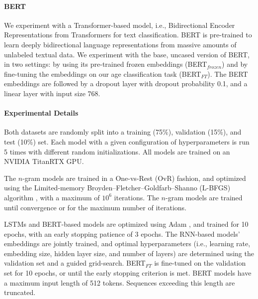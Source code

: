 \paragraph{BERT} 
We experiment with a Transformer-based model, i.e., 
Bidirectional Encoder Representations from Transformers \cite[BERT;][]{devlin-etal-2019-bert} for text classification.
BERT is pre-trained to learn deeply bidirectional language representations from massive amounts of unlabeled textual data. 
We experiment with the base, uncased version of BERT, in two settings: by using its 
pre-trained frozen embeddings (BERT$_{frozen}$) and by fine-tuning the embeddings on our age classification task (BERT$_{FT}$).
The BERT embeddings are followed by a dropout layer with dropout probability 0.1, and a linear layer with input size 768.

\paragraph{Experimental Details} %

Both datasets are randomly split into a training (75\%), validation (15\%), and test (10\%) set.
Each model with a given configuration of hyperparameters is run 5 times with different random initializations. All models are trained on an NVIDIA TitanRTX GPU.

The $n$-gram models are trained in a One-vs-Rest (OvR) fashion, and optimized using the Limited-memory Broyden–Fletcher–Goldfarb–Shanno (L-BFGS) algorithm \citep{liu1989limited}, with a maximum of $10^6$ iterations. The $n$-gram models are trained until convergence or for the maximum number of iterations.

LSTMs and BERT-based models
are optimized using Adam \citep{DBLP:journals/corr/KingmaB14}, and trained for 10 epochs, with an early stopping patience of 3 epochs.
The RNN-based models' embeddings are jointly trained, and optimal hyperparameters (i.e., learning rate, embedding size, hidden layer size, and number of layers)  are determined using the validation set and a guided grid-search. %
BERT$_{FT}$ is fine-tuned on the validation set for 10 epochs, or until the early stopping criterion is met.
BERT models have a maximum input length of 512 tokens. Sequences exceeding this length are truncated.